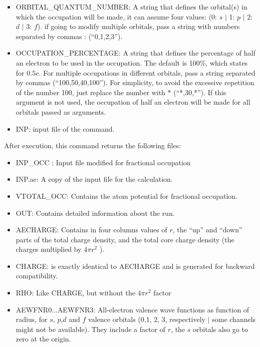 \begin{itemize}
	\item  ORBITAL\_QUANTUM\_NUMBER: A string that defines the orbital(s) in which the occupation will be made, it can assume four values: (0: $s$ $\mid$ 1: $p$ $\mid$ 2: $d$ $\mid$ 3: $f$). if going to modify multiple orbitals, pass a string with numbers separated by commas : (``0,1,2,3'').
	\item  OCCUPATION\_PERCENTAGE: A string that defines the percentage of half an electron to be used in the occupation. The default is 100\%, which states for $0.5e$. For multiple occupations in different orbitals, pass a string separated by commas (``100,50,40,100''). For simplicity, to avoid the excessive repetition of the number 100, just replace the number with $*$ (``*,30,*''). If this argument is not used, the occupation of half an electron will be made for all orbitals passed as arguments.
	
	\item  INP: input file of the  command.
	
\end{itemize}

After execution, this command returns the following files:

\begin{itemize}
    \item INP\_OCC : Input file modified for fractional occupation
    
    \item INP.ae: A copy of the input file for the calculation.
    
    \item VTOTAL\_OCC: Contains the atom potential for fractional occupation.
    
    \item  OUT: Contains detailed information about the run.
    
    \item  AECHARGE: Contains in four columns values of $r$, the “up” and “down”  parts of the total     charge density, and the total core charge density (the charges multiplied by $4\pi r^{2}$ ).
    
    \item CHARGE: is exactly identical to AECHARGE and is generated for backward compatibility.
    
    \item RHO: Like CHARGE, but without the $4\pi r^{2}$ factor
    
	\item AEWFNR0...AEWFNR3: All-electron valence wave functions as function of radius, for $s$, $p$,$ d$ and $f$ valence orbitals (0,1, 2, 3, respectively $\mid$ some channels might not be available). They include a factor of $r$, the $s$ orbitals also go to zero at the origin.


\end{itemize}
